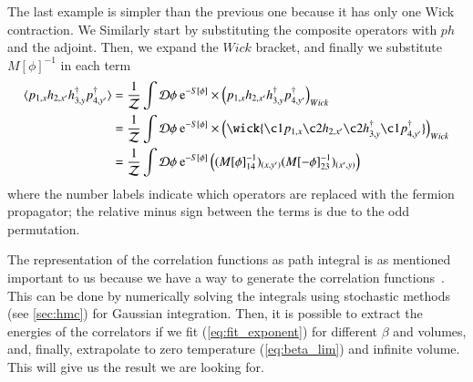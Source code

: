 \begin{itemize}
    The last example is simpler than the previous one because it has only one Wick contraction. We Similarly start by substituting the composite operators with $ph$ and the adjoint. Then, we expand the ${Wick}$ bracket, and finally we substitute $M[\phi]^{-1}$ in each term
    \begin{equation}
        \begin{aligned}
            \langle p_{1,x}h_{2,x'}h^\dagger_{3,y}p^\dagger_{4,y'} \rangle &= \frac{1}{\mathcal{Z}} \int \mathcal{D}\phi \:\mathrm{e}^{-S[\phi]}\times \left(p_{1,x}h_{2,x'}h^\dagger_{3,y}p^\dagger_{4,y'}\right)_{Wick} 
            \\
            &= \frac{1}{\mathcal{Z}} \int \mathcal{D}\phi \:\mathrm{e}^{-S[\phi]}\times \left(\wick{\c1 p_{1,x} \c2 h_{2,x'} \c2 h^\dagger_{3,y} \c1 p^\dagger_{4,y'}}\right)_{Wick} 
            \\
            &= \frac{1}{\mathcal{Z}} \int \mathcal{D}\phi \:\mathrm{e}^{-S[\phi]} \left((M[\phi]^{-1}_{14})_{(x,y')}(M[-\phi]^{-1}_{23})_{(x',y)}\right)
        \end{aligned}
    \end{equation}
    where the number labels indicate which operators are replaced with the fermion propagator; the relative minus sign between the terms is due to the odd permutation.
\end{itemize}

The representation of the correlation functions as path integral is as mentioned important to us because we have a way to generate the correlation functions~\cite{graphhmc}. This can be done by numerically solving the integrals using stochastic methods (see \cref{sec:hmc}) for Gaussian integration. Then, it is possible to extract the energies of the correlators if we fit (\cref{eq:fit_exponent}) for different $\beta$ and volumes, and, finally, extrapolate to zero temperature (\cref{eq:beta_lim}) and infinite volume. This will give us the result we are looking for.



